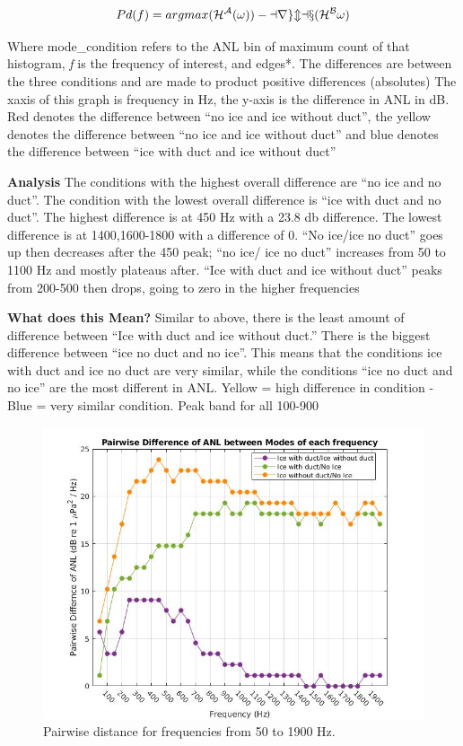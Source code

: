 \[Pd(f)=argmax(\cal{H}^{A}(\omega))-argmax(\cal{H}^{B}\omega)\] 	%

Where mode\_{condition} refers to the ANL bin of maximum count of that histogram, \textit{f} is the frequency of interest, and edges*. The differences are between the three conditions and are made to product positive differences (absolutes)
The xaxis of this graph is frequency in Hz, the y-axis is the difference in ANL in dB. Red denotes the difference between “no ice and ice without duct”, the yellow denotes the difference between “no ice and ice without duct” and blue denotes the difference between “ice with duct and ice without duct”

\textbf{Analysis}
The conditions with the highest overall difference are “no ice and no duct”. The condition with the lowest overall difference is “ice with duct and no duct”. The highest difference is at 450 Hz with a 23.8 db difference. The lowest difference is at 1400,1600-1800 with a difference of 0.
“No ice/ice no duct” goes up then decreases after the 450 peak; “no ice/ ice no duct” increases from 50 to 1100 Hz and mostly plateaus after. “Ice with duct and ice without duct” peaks from 200-500 then drops, going to zero in the higher frequencies

\textbf{What does this Mean?}
Similar to above, there is the least amount of difference between “Ice with duct and ice without duct.” There is the biggest difference between “ice no duct and no ice”. This means that the conditions ice with duct and ice no duct are very similar, while the conditions “ice no duct and no ice” are the most different in ANL. 
Yellow = high difference in condition - Blue = very similar condition. Peak band for all 100-900

\begin{figure}[h]
\centering
\includegraphics[scale=0.5]{Figures/recolor_pairwise_dist_ANLs.jpg}
\caption{Pairwise distance for frequencies from 50 to 1900 Hz.}
\label{fig_pairwisedist}
\end{figure}

